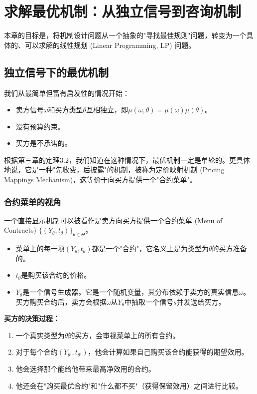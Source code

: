 \section{求解最优机制：从独立信号到咨询机制}

本章的目标是，将机制设计问题从一个抽象的"寻找最佳规则"问题，转变为一个具体的、可以求解的线性规划 (Linear Programming, LP) 问题。

\subsection{独立信号下的最优机制}

我们从最简单但富有启发性的情况开始：

\begin{itemize}
    \item 卖方信号$\omega$和买方类型$\theta$互相独立，即$\mu(\omega,\theta)=\mu(\omega)\mu(\theta)$。
    \item 没有预算约束。
    \item 买方是不承诺的。
\end{itemize}

根据第三章的定理3.2，我们知道在这种情况下，最优机制一定是单轮的。更具体地说，它是一种"先收费，后披露"的机制，被称为定价映射机制 (Pricing Mappings Mechanism)，这等价于向买方提供一个"合约菜单"。

\subsubsection{合约菜单的视角}

一个直接显示机制可以被看作是卖方向买方提供一个合约菜单 (Menu of Contracts) $\{(Y_\theta, t_\theta)\}_{\theta\in\Theta}$。

\begin{itemize}
    \item 菜单上的每一项$(Y_\theta,t_\theta)$都是一个"合约"，它名义上是为类型为$\theta$的买方准备的。
    \item $t_\theta$是购买该合约的价格。
    \item $Y_\theta$是一个信号生成器。它是一个随机变量，其分布依赖于卖方的真实信息$\omega$。买方购买合约后，卖方会根据$\omega$从$Y_\theta$中抽取一个信号$s$并发送给买方。
\end{itemize}

\textbf{买方的决策过程：}

\begin{enumerate}
    \item 一个真实类型为$\theta$的买方，会审视菜单上的所有合约。
    \item 对于每个合约$(Y_{\theta'},t_{\theta'})$，他会计算如果自己购买该合约能获得的期望效用。
    \item 他会选择那个能给他带来最高净效用的合约。
    \item 他还会在"购买最优合约"和"什么都不买"（获得保留效用）之间进行比较。
\end{enumerate}

